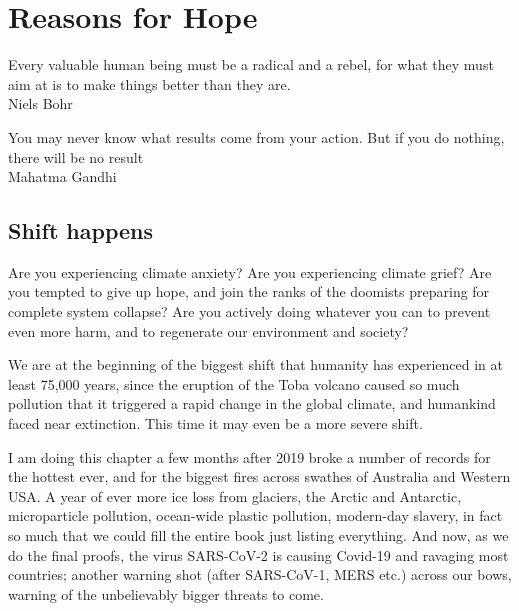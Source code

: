 ﻿%
\chapter{Reasons for Hope}
\label{chapter:reasons-for-hope}


\begin{chapterquotation}
Every valuable human being must be a radical and a rebel, for what they must aim at is to make things better than they are.\\
\raggedleft\textemdash Niels Bohr\cite{bohr-radical}


\centering
You may never know what results come from your action. But if you do nothing, there will be no result\\
\raggedleft\textemdash Mahatma Gandhi
\end{chapterquotation}


\section{Shift happens}
Are you experiencing climate anxiety? Are you experiencing climate grief? Are you tempted to give up hope, and join the ranks of the doomists preparing for complete system collapse? Are you actively doing whatever you can to prevent even more harm, and to regenerate our environment and society?


We are at the beginning of the biggest shift   that humanity has experienced in at least 75,000 years, since the eruption of the Toba volcano caused so much pollution that it triggered a rapid change in the global climate, and humankind faced near extinction. This time it may even be a more severe shift.


I am doing this chapter a few months after 2019 broke a number of records for the hottest ever, and for the biggest fires across swathes of Australia and Western USA. A year of ever more ice loss from glaciers, the Arctic and Antarctic, microparticle pollution, ocean-wide plastic pollution, modern-day slavery, in fact so much that we could fill the entire book just listing everything. And now, as we do the final proofs, the virus SARS-CoV-2 is causing Covid-19 and ravaging most countries; another warning shot (after SARS-CoV-1, MERS etc.) across our bows, warning of the unbelievably bigger threats to come.


